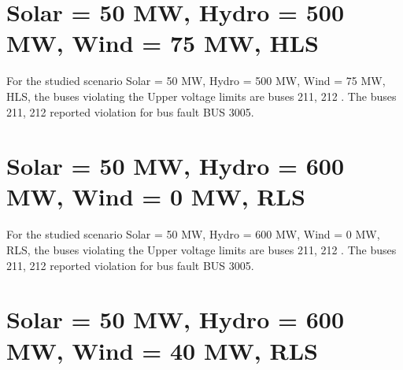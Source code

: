 \documentclass[10pt]{report}
\begin{document}
\section{Solar = 50 MW, Hydro = 500 MW, Wind = 75 MW, HLS}

For the studied scenario Solar = 50 MW, Hydro = 500 MW, Wind = 75 MW, HLS, the buses violating the Upper voltage limits are buses 211, 212 .
The buses 211, 212 reported violation for bus fault BUS 3005.
\begin{table}[H]
\caption{Contingencies reporting bus voltages greater than emergency voltage of 1.1 PU for scenario Solar = 50 MW, Hydro = 500 MW, Wind = 75 MW, HLS}
\label{HVSolar50MWHydro500MWWind75MWHLS}
\centering
{}
\end{table}

\section{Solar = 50 MW, Hydro = 600 MW, Wind = 0 MW, RLS}

For the studied scenario Solar = 50 MW, Hydro = 600 MW, Wind = 0 MW, RLS, the buses violating the Upper voltage limits are buses 211, 212 .
The buses 211, 212 reported violation for bus fault BUS 3005.
\begin{table}[H]
\caption{Contingencies reporting bus voltages greater than emergency voltage of 1.1 PU for scenario Solar = 50 MW, Hydro = 600 MW, Wind = 0 MW, RLS}
\label{HVSolar50MWHydro600MWWind0MWRLS}
\centering
{}
\end{table}

\section{Solar = 50 MW, Hydro = 600 MW, Wind = 40 MW, RLS}
\end{document}
